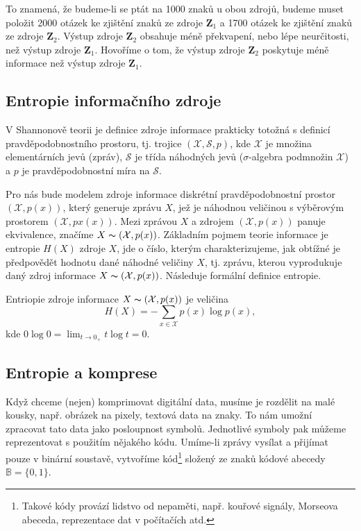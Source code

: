 To znamená, že budeme-li se ptát na 1000 znaků u obou zdrojů, budeme muset položit 2000 otázek ke zjištění znaků ze zdroje $\mathbf{Z}_1$ a 1700 otázek ke zjištění znaků ze zdroje $\mathbf{Z}_2$. Výstup zdroje $\mathbf{Z}_2$ obsahuje méně překvapení, nebo lépe neurčitosti, než výstup zdroje $\mathbf{Z}_1$. Hovoříme o tom, že výstup zdroje $\mathbf{Z}_2$ poskytuje méně informace než výstup zdroje $\mathbf{Z}_1$.

\subsection{Entropie informačního zdroje}
V Shannonově teorii je definice zdroje informace prakticky totožná s definicí pravděpodobnostního prostoru, tj. trojice $(\mathcal{X},\mathcal{S},p)$, kde $\mathcal{X}$ je množina elementárních jevů (zpráv), $\mathcal{S}$ je třída náhodných jevů ($\sigma$-algebra podmnožin $\mathcal{X}$) a $p$ je pravděpodobnostní míra na $\mathcal{S}$. \cite{teorieInformace}

Pro nás bude modelem zdroje informace diskrétní pravděpodobnostní prostor $(\mathcal{X},p(x))$, který generuje zprávu $X$, jež je náhodnou veličinou s výběrovým prostorem $(\mathcal{X}, px(x))$. Mezi zprávou $X$ a zdrojem $(\mathcal{X}, p(x))$ panuje ekvivalence, značíme $X \thicksim (\mathcal{X}, p(x))$. Základním pojmem teorie informace je entropie $H(X)$ zdroje $X$, jde o číslo, kterým charakterizujeme, jak obtížné je předpovědět hodnotu dané náhodné veličiny $X$, tj. zprávu, kterou vyprodukuje daný zdroj informace $X \thicksim (\mathcal{X}, p(x))$. Následuje formální definice entropie. \cite{teorieInformace}

\begin{defi}
Entriopie zdroje informace $X \thicksim (\mathcal{X}, p(x))$ je veličina $$H(X) = -\sum_{x \in \mathcal{X}} p(x)\log p(x),$$ kde $0 \log 0 = \lim_{t \to 0_+} t \log t = 0$.
\end{defi}

\subsection{Entropie a komprese}
Když chceme (nejen) komprimovat digitální data, musíme je rozdělit na malé kousky, např. obrázek na pixely, textová data na znaky. To nám umožní zpracovat tato data jako posloupnost symbolů. Jednotlivé symboly pak můžeme reprezentovat s použitím nějakého kódu. Umíme-li zprávy vysílat a přijímat pouze v binární soustavě, vytvoříme kód\footnote{Takové kódy provází lidstvo od nepaměti, např. kouřové signály, Morseova abeceda, reprezentace dat v počítačích atd.} složený ze znaků kódové abecedy $\mathbb{B} = \{0,1\}$.

